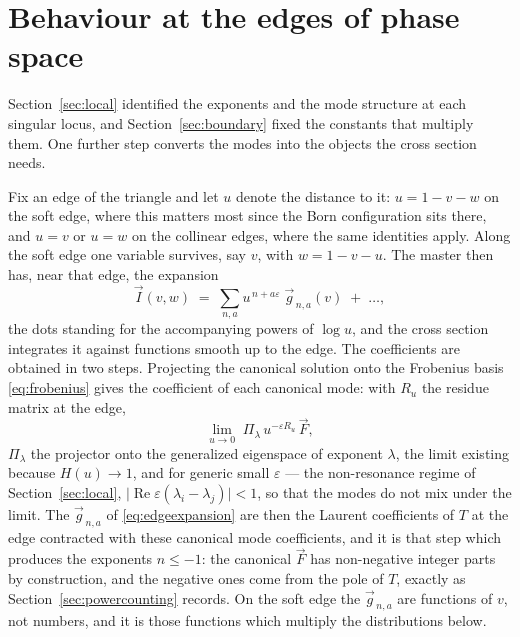 \documentclass[11pt]{article}
\newcommand{\eps}{\varepsilon}
\begin{document}
\section{Behaviour at the edges of phase space}
\label{sec:endpoint}

Section~\ref{sec:local} identified the exponents and the mode
structure at each singular locus, and Section~\ref{sec:boundary}
fixed the constants that multiply them.  One further step converts
the modes into the objects the cross section needs.

Fix an edge of the triangle and let $u$ denote the distance to it:
$u = 1-v-w$ on the soft edge, where this matters most since the Born
configuration sits there, and $u = v$ or $u = w$ on the collinear
edges, where the same identities apply.  Along the soft edge one
variable survives, say $v$, with $w = 1-v-u$.  The master then has,
near that edge, the expansion
\begin{equation}
  \vec I(v,w) \;=\; \sum_{n,a} u^{\,n+a\eps}\;
  \vec g_{\,n,a}(v) \;+\; \dots ,
  \label{eq:edgeexpansion}
\end{equation}
the dots standing for the accompanying powers of $\log u$, and the
cross section integrates it against functions smooth up to the edge.
The coefficients are obtained in two steps.  Projecting the canonical
solution onto the Frobenius basis \eqref{eq:frobenius} gives the
coefficient of each canonical mode: with $R_u$ the residue matrix at
the edge,
\begin{equation}
  \lim_{u\to0}\; \Pi_\lambda\, u^{-\eps R_u}\,\vec F ,
  \label{eq:modeprojection}
\end{equation}
$\Pi_\lambda$ the projector onto the generalized eigenspace of
exponent $\lambda$, the limit existing because $H(u) \to 1$, and for
generic small $\eps$ --- the non-resonance regime of
Section~\ref{sec:local}, $\lvert\operatorname{Re}\eps(\lambda_i -
\lambda_j)\rvert < 1$, so that the modes do not mix under the limit.
The $\vec g_{\,n,a}$ of \eqref{eq:edgeexpansion} are then the
Laurent coefficients of $T$ at the edge contracted with these
canonical mode coefficients, and it is that step which produces the
exponents $n \le -1$: the canonical $\vec F$ has non-negative integer
parts by construction, and the negative ones come from the pole of
$T$, exactly as Section~\ref{sec:powercounting} records.  On the soft
edge the $\vec g_{\,n,a}$ are functions of $v$, not numbers, and it
is those functions which multiply the distributions below.
\end{document}
